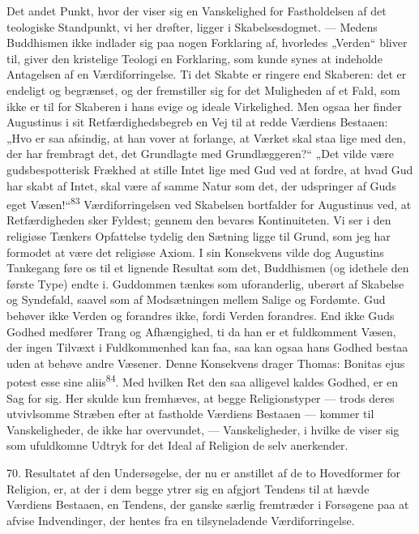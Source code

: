 \documentclass[12pt,a4paper,openany]{book}
\newcommand{\opage}[1]{\marginnote{\footnotesize\textit{[#1]}}}
\begin{document}
Det andet Punkt, hvor der viser sig en Vanskelighed for Fastholdelsen af
det teologiske Standpunkt, vi her drøfter, ligger i Skabelsesdogmet. ---
Medens Buddhismen ikke indlader sig paa nogen Forklaring af, hvorledes
„Verden“ bliver til, giver den kristelige Teologi en Forklaring, som
kunde synes at indeholde Antagelsen af en Værdiforringelse. Ti det
Skabte er ringere end Skaberen: det er endeligt og begrænset, og der
fremstiller sig for det Muligheden af et Fald, som ikke er til for
Skaberen i hans evige og ideale Virkelighed. Men ogsaa her finder
Augustinus i sit Retfærdighedsbegreb en Vej til at redde Værdiens
Bestaaen: „Hvo er saa afsindig, at han vover at forlange, at Værket skal
staa lige med den, der har frembragt det, det Grundlagte med
Grundlæggeren?“ „Det vilde være gudsbespotterisk Frækhed at stille Intet
lige med Gud ved at fordre, at hvad Gud har skabt af Intet, skal være af
samme Natur som det, der udspringer af Guds eget
Væsen!“\textsuperscript{83} Værdiforringelsen ved Skabelsen bortfalder
for Augustinus ved, at Retfærdigheden sker Fyldest; gennem den bevares
Kontinuiteten. Vi ser i den religiøse Tænkers Opfattelse tydelig den
Sætning ligge til Grund, som jeg har formodet at være det religiøse
Axiom. I sin Konsekvens vilde dog Augustins Tankegang føre os til et
lignende Resultat som det, Buddhismen (og
\opage{163}idethele den første Type) endte i. Guddommen tænkes som
uforanderlig, uberørt af Skabelse og Syndefald, saavel som af
Modsætningen mellem Salige og Fordømte. Gud behøver ikke Verden og
forandres ikke, fordi Verden forandres. End ikke Guds Godhed medfører
Trang og Afhængighed, ti da han er et fuldkomment Væsen, der ingen
Tilvæxt i Fuldkommenhed kan faa, saa kan ogsaa hans Godhed bestaa uden
at behøve andre Væsener. Denne Konsekvens drager Thomas: Bonitas ejus
potest esse sine aliis\textsuperscript{84}. Med hvilken Ret den saa
alligevel kaldes Godhed, er en Sag for sig. Her skulde kun fremhæves, at
begge Religionstyper --- trods deres utvivlsomme Stræben efter at
fastholde Værdiens Bestaaen --- kommer til Vanskeligheder, de ikke har
overvundet, --- Vanskeligheder, i hvilke de viser sig som ufuldkomne
Udtryk for det Ideal af Religion de selv anerkender.

70. Resultatet af den Undersøgelse, der nu er anstillet af de to
Hovedformer for Religion, er, at der i dem begge ytrer sig en afgjort
Tendens til at hævde Værdiens Bestaaen, en Tendens, der ganske særlig
fremtræder i Forsøgene paa at afvise Indvendinger, der hentes fra en
tilsyneladende Værdiforringelse.
\end{document}

